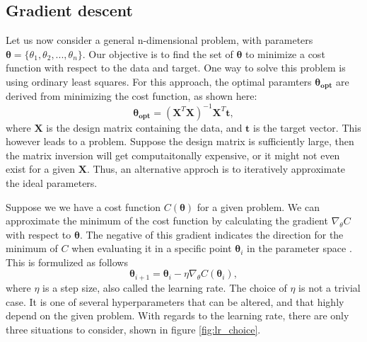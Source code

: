 \subsection*{Gradient descent}
Let us now consider a general n-dimensional problem, with parameters $\boldsymbol{\theta} = \{\theta_1, \theta_2, ..., \theta_n\}$. 
Our objective is to find the set of $\boldsymbol{\theta}$ to minimize a cost function with respect to the data and target. 
One way to solve this problem is using ordinary least squares. For this approach, 
the optimal paramters $\boldsymbol{\theta_{opt}}$ are derived from minimizing the cost function, as shown here:
\begin{equation*}
    \boldsymbol{\theta_{opt}} = (\boldsymbol{X}^T\boldsymbol{X})^{-1}\boldsymbol{X}^T\boldsymbol{t},
\end{equation*}
where $\boldsymbol{X}$ is the design matrix containing the data, and $\boldsymbol{t}$ is the target vector. This however leads to a problem. Suppose the design matrix is sufficiently large,
then the matrix inversion will get computaitonally expensive, or it might not even exist for a given $\boldsymbol{X}$. Thus, an alternative approch is to iteratively approximate the ideal 
parameters. \par 
Suppose we we have a cost function $C(\boldsymbol{\theta})$ for a given problem. We can approximate the minimum of the cost function by calculating
the gradient $\nabla_{\theta}C$ with respect to $\boldsymbol{\theta}$. The negative of this gradient indicates the direction for the minimum of $C$ when evaluating 
it in a specific point $\boldsymbol{\theta}_i$ in the parameter space \cite{FYSSTK}. This is formulized as follows 
\begin{equation}
    \boldsymbol{\theta}_{i+1} = \boldsymbol{\theta}_i - \eta\nabla_{\theta}C(\boldsymbol{\theta}_i),
\end{equation}
where $\eta$ is a step size, also called the learning rate. The choice of $\eta$ is not a trivial case. It is one of several 
hyperparameters\cite{Goodfellow-et-al-2016} that can be altered, and that highly depend on the given problem. 
With regards to the learning rate, there are only three situations to consider, shown in figure \ref{fig:lr_choice}.

